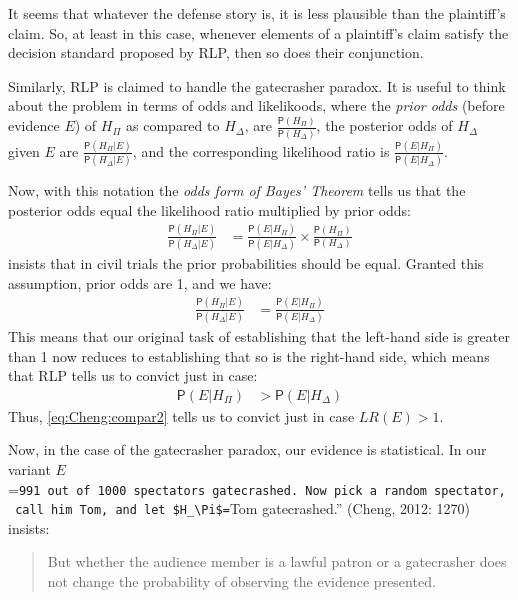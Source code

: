 \documentclass[10pt,dvipsnames,enabledeprecatedfontcommands]{scrartcl}
\newcommand{\pr}[1]{\mathsf{P}(#1)}
\begin{document}
\noindent It seems that whatever the defense story is, it is less
plausible than the plaintiff's claim. So, at least in this case,
whenever elements of a plaintiff's claim satisfy the decision standard
proposed by RLP, then so does their conjunction.

Similarly, RLP is claimed to handle the gatecrasher paradox. It is
useful to think about the problem in terms of odds and likelikoods,
where the \emph{prior odds} (before evidence \(E\)) of \(H_\Pi\) as
compared to \(H_\Delta\), are \(\frac{\pr{H_\Pi}}{\pr{H_\Delta}}\), the
posterior odds of \(H_\Delta\) given \(E\) are
\(\frac{\pr{H_\Pi \vert E}}{\pr{H_\Delta \vert E}}\), and the
corresponding likelihood ratio is
\(\frac{\pr{E\vert H_\Pi}}{\pr{E\vert H_\Delta}}\).

Now, with this notation the \emph{odds form of Bayes' Theorem} tells us
that the posterior odds equal the likelihood ratio multiplied by prior
odds: \begin{align*}
\frac{\pr{H_\Pi \vert E}}{\pr{H_\Delta \vert E}} & = 
\frac{\pr{E\vert H_\Pi}}{\pr{E\vert H_\Delta}} 
\times \frac{\pr{H_\Pi}}{\pr{H_\Delta}}
 \end{align*}  insists that
in civil trials the prior probabilities should be equal. Granted this
assumption, prior odds are 1, and we have:
\begin{align}\label{eq:cheng_simple_odds}
\frac{\pr{H_\Pi \vert E}}{\pr{H_\Delta \vert E}} & = 
\frac{\pr{E\vert H_\Pi}}{\pr{E\vert H_\Delta}} 
 \end{align} This means that our original task of establishing that the
left-hand side is greater than 1 now reduces to establishing that so is
the right-hand side, which means that RLP tells us to convict just in
case: \begin{align}\label{eq:Cheng:compar2}
\pr{E\vert H_\Pi} &> \pr{E\vert H_\Delta}
\end{align} Thus, \eqref{eq:Cheng:compar2} tells us to convict just in
case \(LR(E)>1\).

Now, in the case of the gatecrasher paradox, our evidence is
statistical. In our variant
\(E\)=\texttt{991\ out\ of\ 1000\ spectators\ gatecrashed\textquotesingle{}\textquotesingle{}.\ Now\ pick\ a\ random\ spectator,\ call\ him\ Tom,\ and\ let\ \$H\_\textbackslash{}Pi\$=}Tom
gatecrashed.'' (Cheng, 2012: 1270) insists:

\begin{quote}
But whether the audience member is a lawful patron or a gatecrasher does not change the probability of observing the evidence presented.
\end{quote}
\end{document}
